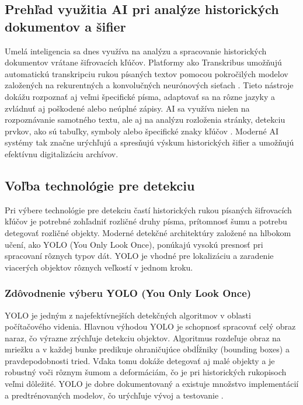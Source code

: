    \subsection{Prehľad využitia AI pri analýze historických dokumentov a šifier}
    Umelá inteligencia sa dnes využíva na analýzu a spracovanie historických dokumentov vrátane šifrovacích kľúčov. Platformy ako Transkribus umožňujú automatickú transkripciu rukou písaných textov pomocou pokročilých modelov založených na rekurentných a konvolučných neurónových sieťach \cite{michael2018transkribus}. Tieto nástroje dokážu rozpoznať aj veľmi špecifické písma, adaptovať sa na rôzne jazyky a zvládnuť aj poškodené alebo neúplné zápisy. AI sa využíva nielen na rozpoznávanie samotného textu, ale aj na analýzu rozloženia stránky, detekciu prvkov, ako sú tabuľky, symboly alebo špecifické znaky kľúčov \cite{gruning2019read}. Moderné AI systémy tak značne urýchľujú a spresňujú výskum historických šifier a umožňujú efektívnu digitalizáciu archívov.
    \subsection{Voľba technológie pre detekciu}
    Pri výbere technológie pre detekciu častí historických rukou písaných šifrovacích kľúčov je potrebné zohľadniť rozličné druhy písma, prítomnosť šumu a potrebu detegovať rozličné objekty. Moderné detekčné architektúry založené na hlbokom učení, ako YOLO (You Only Look Once)\cite{redmon2016yolo}, ponúkajú vysokú presnosť pri spracovaní rôznych typov dát. YOLO je vhodné pre lokalizáciu a zaradenie viacerých objektov rôznych veľkostí v jednom kroku.
        \subsubsection{Zdôvodnenie výberu YOLO (You Only Look Once)}
        YOLO je jedným z najefektívnejších detekčných algoritmov v oblasti počítačového videnia. Hlavnou výhodou YOLO je schopnosť spracovať celý obraz naraz, čo výrazne zrýchľuje detekciu objektov. Algoritmus rozdeľuje obraz na mriežku a v každej bunke predikuje ohraničujúce obdĺžniky (bounding boxes) a pravdepodobnosti tried. Vďaka tomu dokáže detegovať aj malé objekty a je robustný voči rôznym šumom a deformáciám, čo je pri historických rukopisoch veľmi dôležité. YOLO je dobre dokumentovaný a existuje množstvo implementácií a predtrénovaných modelov, čo urýchľuje vývoj a testovanie \cite{redmon2016yolo}.
